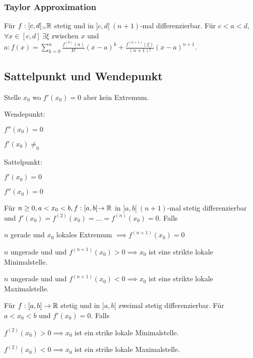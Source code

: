 \subsubsection{Taylor Approximation}
Für $f:[c,d] _> \mathbb{R}$ stetig und in $]c, d[ \ (n+1)$-mal differenzierbar. Für $c < a < d$, $\forall x \in [c, d] \ \exists \xi$ zwischen $x$ und $a: f(x) = \sum_{k=0}^{n} \frac{f^{(k)}(a)}{k!}(x-a)^k + \frac{f^{(n+1)}(\xi)}{(n+1)!}(x-a)^{n+1}$.

\subsection{Sattelpunkt und Wendepunkt}
Stelle $x_0$ wo $f'(x_0)=0$ aber kein Extremum.
\begin{compactdesc}
    \item[Wendepunkt:]
        \begin{inparaitem}
            \item $f''(x_0)=0$
            \item $f'(x_0)\neq_0$
        \end{inparaitem}
    \item[Sattelpunkt:]
        \begin{inparaitem}
            \item $f'(x_0) = 0$
            \item $f''(x_0) = 0$
        \end{inparaitem}
\end{compactdesc}

Für $n \ge 0, a < x_0 < b, f:[a,b[ \to \mathbb{R}$ in $]a,b[ \ (n+1)$-mal stetig differenzierbar und $f'(x_0) = f^{(2)}(x_0) = \dots = f^{(n)}(x_0) = 0$. Falls
\begin{compactenum}
    \item $n$ gerade und $x_0$ lokales Extremum $\implies f^{(n+1)}(x_0) = 0$
    \item $n$ ungerade und und $f^{(n+1)}(x_0) > 0 \implies x_0$ ist eine strikte lokale Minimalstelle.
    \item $n$ ungerade und und $f^{(n+1)}(x_0) < 0 \implies x_0$ ist eine strikte lokale Maximalstelle.
\end{compactenum}

Für $f:[a,b] \to \mathbb{R}$ stetig und in $]a,b[$ zweimal stetig differenzierbar. Für $a < x_0 < b$ und $f'(x_0) = 0$. Falls
\begin{compactenum}
    \item $f^{(2)}(x_0) > 0 \implies x_0$ ist ein strike lokale Minimalstelle.
    \item $f^{(2)}(x_0) < 0 \implies x_0$ ist ein strike lokale Maximalstelle.
\end{compactenum}

